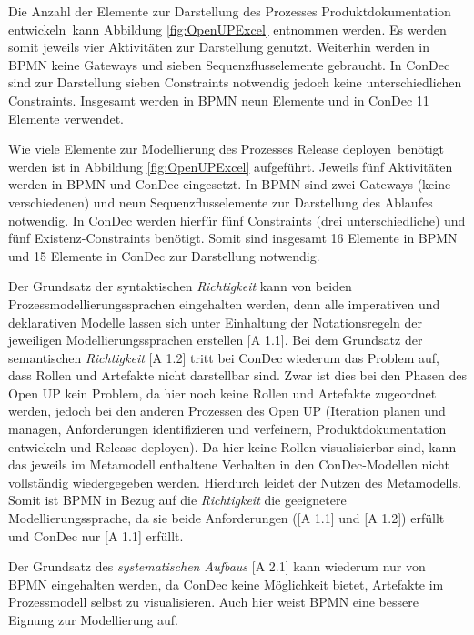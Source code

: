 Die Anzahl der Elemente zur Darstellung des Prozesses \grqq Produktdokumentation entwickeln\grqq \ kann Abbildung \ref{fig:OpenUPExcel} entnommen werden. Es werden somit jeweils vier Aktivitäten zur Darstellung genutzt. Weiterhin werden in BPMN keine Gateways und sieben Sequenzflusselemente gebraucht. In ConDec sind zur Darstellung sieben Constraints notwendig jedoch keine unterschiedlichen Constraints. Insgesamt werden in BPMN neun Elemente und in ConDec 11 Elemente verwendet.\newline


Wie viele Elemente zur Modellierung des Prozesses \grqq Release deployen\grqq \ benötigt werden ist in Abbildung \ref{fig:OpenUPExcel} aufgeführt. Jeweils fünf Aktivitäten werden in BPMN und ConDec eingesetzt. In BPMN sind zwei Gateways (keine verschiedenen) und neun Sequenzflusselemente zur Darstellung des Ablaufes notwendig. In ConDec werden hierfür fünf Constraints (drei unterschiedliche)  und fünf Existenz-Constraints benötigt. Somit sind insgesamt 16 Elemente in BPMN und 15 Elemente in ConDec zur Darstellung notwendig. \newline


Der Grundsatz der syntaktischen \textit{Richtigkeit} kann von beiden Prozessmodellierungssprachen eingehalten werden, denn alle imperativen und deklarativen Modelle lassen sich unter Einhaltung der Notationsregeln der jeweiligen Modellierungssprachen erstellen [A 1.1].\newline
Bei dem Grundsatz der semantischen \textit{Richtigkeit} [A 1.2] tritt bei ConDec wiederum das Problem auf, dass Rollen und Artefakte nicht darstellbar sind. Zwar ist dies bei den Phasen des Open UP kein Problem, da hier noch keine Rollen und Artefakte zugeordnet werden, jedoch bei den anderen Prozessen des Open UP (Iteration planen und managen, Anforderungen identifizieren und verfeinern, Produktdokumentation entwickeln und Release deployen). Da hier keine Rollen visualisierbar sind, kann das jeweils im Metamodell enthaltene Verhalten in den ConDec-Modellen nicht vollständig wiedergegeben werden. Hierdurch leidet der Nutzen des Metamodells. \newline
Somit ist BPMN in Bezug auf die \textit{Richtigkeit} die geeignetere Modellierungssprache, da sie beide Anforderungen ([A 1.1] und [A 1.2]) erfüllt und ConDec nur [A 1.1] erfüllt.\newline

Der Grundsatz des \textit{systematischen Aufbaus} [A 2.1] kann wiederum nur von BPMN eingehalten werden, da ConDec keine Möglichkeit bietet, Artefakte im Prozessmodell selbst zu visualisieren.\newline
Auch hier weist BPMN eine bessere Eignung zur Modellierung auf.\newline

